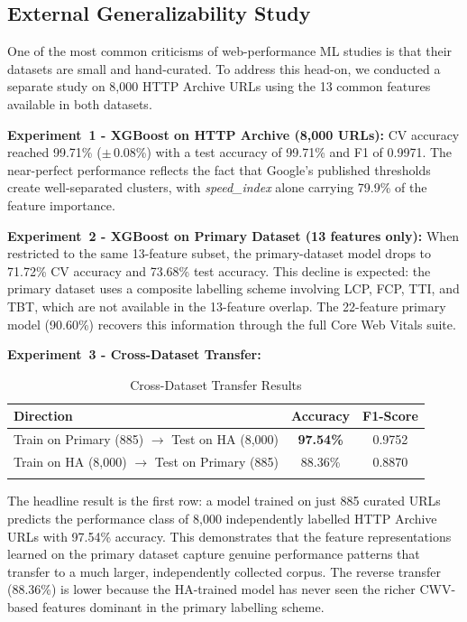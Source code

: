 \documentclass[sn-nature]{sn-jnl}
\begin{document}
\subsection{External Generalizability Study}

One of the most common criticisms of web-performance ML studies is that their datasets are small and hand-curated. To address this head-on, we conducted a separate study on 8,000 HTTP Archive URLs using the 13 common features available in both datasets.

\textbf{Experiment~1 - XGBoost on HTTP Archive (8,000 URLs):} CV accuracy reached 99.71\% ($\pm$\,0.08\%) with a test accuracy of 99.71\% and F1 of 0.9971. The near-perfect performance reflects the fact that Google's published thresholds create well-separated clusters, with \textit{speed\_index} alone carrying 79.9\% of the feature importance.

\textbf{Experiment~2 - XGBoost on Primary Dataset (13 features only):} When restricted to the same 13-feature subset, the primary-dataset model drops to 71.72\% CV accuracy and 73.68\% test accuracy. This decline is expected: the primary dataset uses a composite labelling scheme involving LCP, FCP, TTI, and TBT, which are not available in the 13-feature overlap. The 22-feature primary model (90.60\%) recovers this information through the full Core Web Vitals suite.

\textbf{Experiment~3 - Cross-Dataset Transfer:}

\begin{table}[htbp]
\caption{Cross-Dataset Transfer Results}\label{tab:cross_dataset}
\centering
\begin{tabular}{l c c}
\toprule
Direction & Accuracy & F1-Score \\
\midrule
Train on Primary (885) $\rightarrow$ Test on HA (8,000) & \textbf{97.54\%} & 0.9752 \\
Train on HA (8,000) $\rightarrow$ Test on Primary (885) & 88.36\% & 0.8870 \\
\botrule
\end{tabular}
\end{table}

The headline result is the first row: a model trained on just 885 curated URLs predicts the performance class of 8,000 independently labelled HTTP Archive URLs with 97.54\% accuracy. This demonstrates that the feature representations learned on the primary dataset capture genuine performance patterns that transfer to a much larger, independently collected corpus. The reverse transfer (88.36\%) is lower because the HA-trained model has never seen the richer CWV-based features dominant in the primary labelling scheme.
\end{document}
